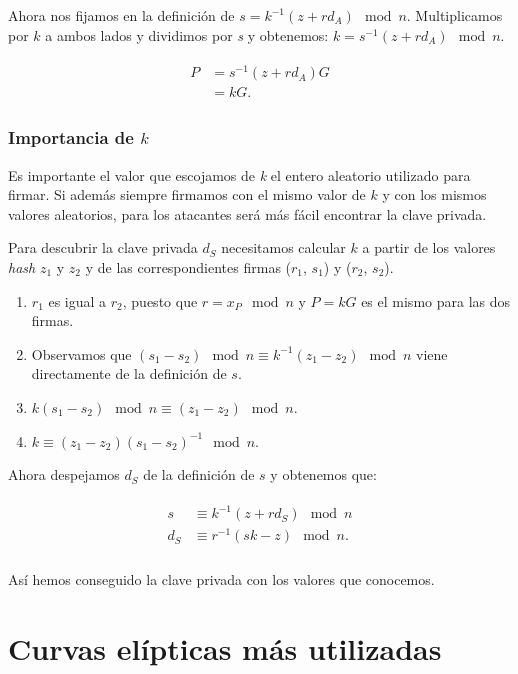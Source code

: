 \documentclass[11pt]{article}
\begin{document}
Ahora nos fijamos en la definición de $s = k^{-1}(z + r d_A) \mod n$. Multiplicamos por $k$ a ambos lados y dividimos por \textit{s} y obtenemos: $k = s^{-1} (z + r d_A) \mod n$.

\begin{align}
\begin{split}
P &= s^{-1}(z + r d_A) G\\
&= kG.
\end{split}
\end{align}


\subsubsection*{Importancia de $k$}

Es importante el valor que escojamos de \textit{k} el entero aleatorio utilizado para firmar. Si además siempre firmamos con el mismo valor de $k$ y con los mismos valores aleatorios, para los atacantes será más fácil encontrar la clave privada.

Para descubrir la clave privada $d_S$ necesitamos calcular $k$ a partir de los valores \textit{hash} $z_1$ y $z_2$ y de las correspondientes firmas ($r_1$, $s_1$) y ($r_2$, $s_2$).


\begin{enumerate}
	\item $r_1$ es igual a $r_2$, puesto que $ r = x_P \mod n$ y $P = kG$ es el mismo para las dos firmas.
	\item Observamos que  $(s_1 - s_2) \mod n \equiv k^{-1} (z_1 - z_2) \mod n$ viene directamente de la definición de $s$.
	\item $k(s_1 - s_2) \mod n \equiv (z_1 - z_2) \mod n$.
	\item $k  \equiv (z_1 - z_2) (s_1 -s_2)^{-1} \mod n$.
\end{enumerate}

Ahora despejamos $d_S$ de la definición de $s$ y obtenemos que:


\begin{align}
\begin{split}
s &\equiv k^{-1}(z + r d_S) \mod n\\
d_S &\equiv r^{-1}(sk - z) \mod n.\\
\end{split}
\end{align}

Así hemos conseguido la clave privada con los valores que conocemos.

\section{Curvas elípticas más utilizadas}
\label{sec:cur_usa}
\end{document}
